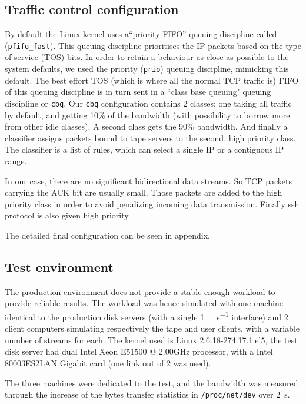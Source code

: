 \documentclass[a4paper]{jpconf}
\begin{document}
\subsection{Traffic control configuration}
By default the Linux kernel uses a``priority FIFO'' queuing discipline called (\verb#pfifo_fast#). This queuing discipline prioritises the IP packets based on the type of service (TOS) bits. In order to retain a behaviour as close as possible to the system defaults, we used the priority (\verb#prio#) queuing discipline, mimicking this default. The best effort TOS (which is where all the normal TCP traffic is) FIFO of this queuing discipline is in turn sent in a ``class base queuing" queuing discipline or \verb#cbq#. Our \verb#cbq# configuration contains 2 classes; one taking all traffic by default, and getting 10\% of the bandwidth (with possibility to borrow more from other idle classes). A second class gets the 90\% bandwidth. And finally a classifier assigns packets bound to tape servers to the second, high priority class. The classifier is a list of rules, which can select a single IP or a contiguous IP range.

In our case, there are no significant bidirectional data streams. So TCP packets carrying the ACK bit are usually small. Those packets are added to the high priority class in order to avoid penalizing incoming data transmission. Finally ssh protocol is also given high priority.

The detailed final configuration can be seen in appendix.

\subsection{Test environment}
The production environment does not provide a stable enough workload to provide reliable results. The workload was hence simulated with one machine identical to the production disk servers (with a single \SI[per-mode=symbol]{1}{\giga\bit\per\second} interface) and 2 client computers simulating respectively the tape and user clients, with a variable number of streams for each. The kernel used is Linux 2.6.18-274.17.1.el5, the test disk server had dual Intel Xeon E51500 @ 2.00GHz processor, with a Intel 80003ES2LAN Gigabit card (one link out of 2 was used).

The three machines were dedicated to the test, and the bandwidth was measured through the increase of the bytes transfer statistics in \verb#/proc/net/dev# over \SI{2}{\second}.
\end{document}
